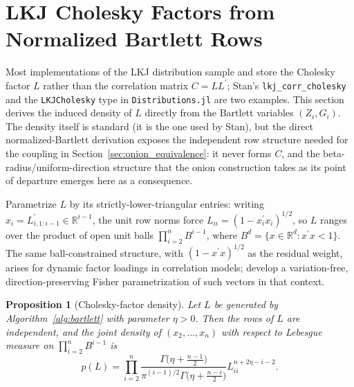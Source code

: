 \documentclass[12pt,english]{article}
\theoremstyle{plain} %
\newtheorem{proposition}{Proposition}
\theoremstyle{definition} %
\theoremstyle{remark} %
\begin{document}
\section{LKJ Cholesky Factors from Normalized Bartlett Rows}
\label{sec:cholesky_density}

Most implementations of the LKJ distribution sample and store the Cholesky factor $L$ rather than the correlation matrix $C=LL^\prime$; Stan's \texttt{lkj\_corr\_cholesky} \citep{Carpenter:2017} and the \texttt{LKJCholesky} type in \texttt{Distributions.jl} \citep{Besancon:2021} are two examples. This section derives the induced density of $L$ directly from the Bartlett variables $(Z_i,G_i)$. The density itself is standard (it is the one used by Stan), but the direct normalized-Bartlett derivation exposes the independent row structure needed for the coupling in Section~\ref{sec:onion_equivalence}: it never forms $C$, and the beta-radius/uniform-direction structure that the onion construction takes as its point of departure emerges here as a consequence.

Parametrize $L$ by its strictly-lower-triangular entries: writing $x_i=L_{i,1:i-1}^\prime\in\mathbb{R}^{i-1}$, the unit row norms force $L_{ii}=(1-x_i^\prime x_i)^{1/2}$, so $L$ ranges over the product of open unit balls $\prod_{i=2}^n B^{i-1}$, where $B^{d}=\{x\in\mathbb{R}^{d}:x^\prime x<1\}$. The same ball-constrained structure, with $(1-x^\prime x)^{1/2}$ as the residual weight, arises for dynamic factor loadings in correlation models; \citet{TongHansen:2025FactorGARCH} develop a variation-free, direction-preserving Fisher parametrization of such vectors in that context.

\begin{proposition}[Cholesky-factor density]
\label{prop:cholesky_density}
Let $L$ be generated by Algorithm~\ref{alg:bartlett} with parameter $\eta>0$. Then the rows of $L$ are independent, and the joint density of $(x_2,\ldots,x_n)$ with respect to Lebesgue measure on $\prod_{i=2}^n B^{i-1}$ is
$$
p(L)=\prod_{i=2}^n
\frac{\Gamma\bigl(\eta+\frac{n-1}{2}\bigr)}{\pi^{(i-1)/2}\Gamma\bigl(\eta+\frac{n-i}{2}\bigr)}
L_{ii}^{n+2\eta-i-2}.
$$
\end{proposition}
\end{document}
